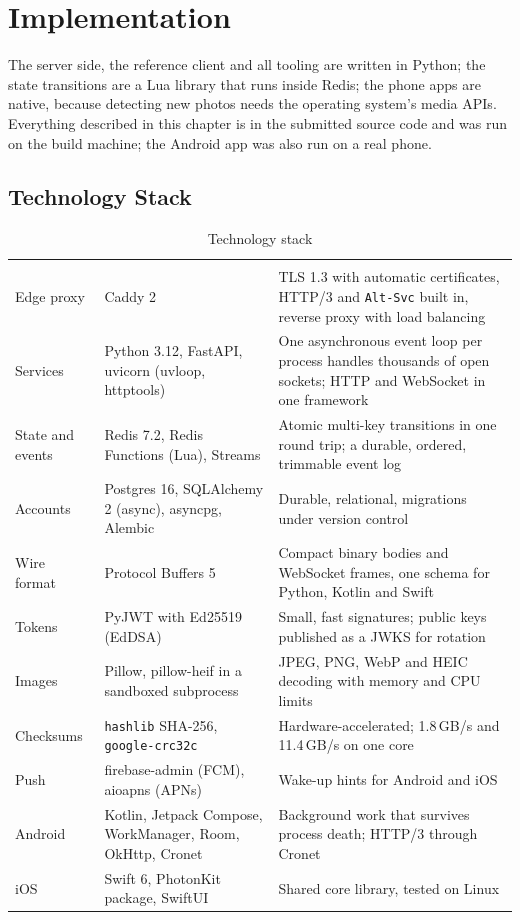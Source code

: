 \section{Implementation}\label{sec:impl}

The server side, the reference client and all tooling are written in Python; the state transitions are a Lua library that runs inside Redis; the phone apps are native, because detecting new photos needs the operating system's media APIs. Everything described in this chapter is in the submitted source code and was run on the build machine; the Android app was also run on a real phone.

\subsection{Technology Stack}

\begin{table}[H]
\centering
\small\stripes
\begin{tabularx}{\linewidth}{L{2.6cm}L{4.4cm}Y}
\headrow {} &  & \\
Edge proxy & Caddy 2 & TLS 1.3 with automatic certificates, HTTP/3 and \texttt{Alt-Svc} built in, reverse proxy with load balancing \\
Services & Python 3.12, FastAPI, uvicorn (uvloop, httptools) & One asynchronous event loop per process handles thousands of open sockets; HTTP and WebSocket in one framework \\
State and events & Redis 7.2, Redis Functions (Lua), Streams & Atomic multi-key transitions in one round trip; a durable, ordered, trimmable event log \\
Accounts & Postgres 16, SQLAlchemy 2 (async), asyncpg, Alembic & Durable, relational, migrations under version control \\
Wire format & Protocol Buffers 5 & Compact binary bodies and WebSocket frames, one schema for Python, Kotlin and Swift \\
Tokens & PyJWT with Ed25519 (EdDSA) & Small, fast signatures; public keys published as a JWKS for rotation \\
Images & Pillow, pillow-heif in a sandboxed subprocess & JPEG, PNG, WebP and HEIC decoding with memory and CPU limits \\
Checksums & \texttt{hashlib} SHA-256, \texttt{google-crc32c} & Hardware-accelerated; 1.8\,GB/s and 11.4\,GB/s on one core \\
Push & firebase-admin (FCM), aioapns (APNs) & Wake-up hints for Android and iOS \\
Android & Kotlin, Jetpack Compose, WorkManager, Room, OkHttp, Cronet & Background work that survives process death; HTTP/3 through Cronet \\
iOS & Swift 6, PhotonKit package, SwiftUI & Shared core library, tested on Linux \\
\end{tabularx}
\caption{Technology stack}\label{tab:stack}
\end{table}

